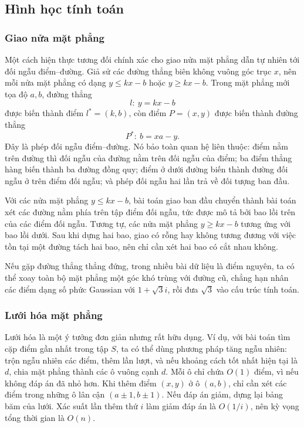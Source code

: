 \documentclass[11pt]{article}
\begin{document}
\subsection{Hình học tính toán}

\subsubsection{Giao nửa mặt phẳng}

Một cách hiện thực tương đối chính xác cho giao nửa mặt phẳng dẫn tự nhiên tới
đối ngẫu điểm--đường. Giả sử các đường thẳng biên không vuông góc trục $x$, nên
mỗi nửa mặt phẳng có dạng $y\le kx-b$ hoặc $y\ge kx-b$. Trong mặt phẳng mới
tọa độ $a,b$, đường thẳng
\[
  l:\ y=kx-b
\]
được biến thành điểm $l^*=(k,b)$, còn điểm $P=(x,y)$ được biến thành đường
thẳng
\[
  P^*:\ b=xa-y.
\]
Đây là phép đối ngẫu điểm--đường. Nó bảo toàn quan hệ liên thuộc: điểm nằm trên
đường thì đối ngẫu của đường nằm trên đối ngẫu của điểm; ba điểm thẳng hàng
biến thành ba đường đồng quy; điểm ở dưới đường biến thành đường đối ngẫu ở
trên điểm đối ngẫu; và phép đối ngẫu hai lần trả về đối tượng ban đầu.

Với các nửa mặt phẳng $y\le kx-b$, bài toán giao ban đầu chuyển thành bài toán
xét các đường nằm phía trên tập điểm đối ngẫu, tức được mô tả bởi bao lồi trên
của các điểm đối ngẫu. Tương tự, các nửa mặt phẳng $y\ge kx-b$ tương ứng với
bao lồi dưới. Sau khi dựng hai bao, giao có rỗng hay không tương đương với việc
tồn tại một đường tách hai bao, nên chỉ cần xét hai bao có cắt nhau không.

Nếu gặp đường thẳng thẳng đứng, trong nhiều bài dữ liệu là điểm nguyên, ta có
thể xoay toàn bộ mặt phẳng một góc khó trùng với đường cũ, chẳng hạn nhân các
điểm dạng số phức Gaussian với $1+\sqrt3 i$, rồi đưa $\sqrt3$ vào cấu trúc tính
toán.

\subsubsection{Lưới hóa mặt phẳng}

Lưới hóa là một ý tưởng đơn giản nhưng rất hữu dụng. Ví dụ, với bài toán tìm
cặp điểm gần nhất trong tập $S$, ta có thể dùng phương pháp tăng ngẫu nhiên:
trộn ngẫu nhiên các điểm, thêm lần lượt, và nếu khoảng cách tốt nhất hiện tại
là $d$, chia mặt phẳng thành các ô vuông cạnh $d$. Mỗi ô chỉ chứa $O(1)$ điểm,
vì nếu không đáp án đã nhỏ hơn. Khi thêm điểm $(x,y)$ ở ô $(a,b)$, chỉ cần xét
các điểm trong những ô lân cận $(a\pm1,b\pm1)$. Nếu đáp án giảm, dựng lại bảng
băm của lưới. Xác suất lần thêm thứ $i$ làm giảm đáp án là $O(1/i)$, nên kỳ
vọng tổng thời gian là $O(n)$.
\end{document}
